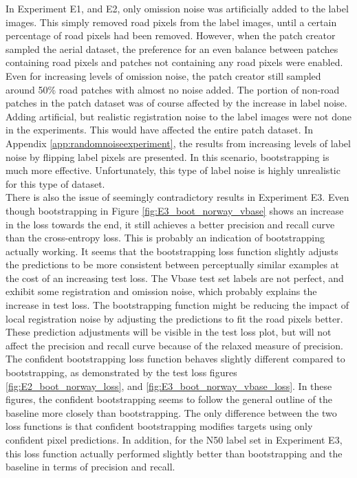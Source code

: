 In Experiment E1, and E2, only omission noise was artificially added to the label images. This simply removed road pixels from the label images, until a certain percentage of road pixels had been removed. However, when the patch creator sampled the aerial dataset, the preference for an even balance between patches containing road pixels and patches not containing any road pixels were enabled. Even for increasing levels of omission noise, the patch creator still sampled around 50\% road patches with almost no noise added. The portion of non-road patches in the patch dataset was of course affected by the increase in label noise. Adding artificial, but realistic registration noise to the label images were not done in the experiments. This would have affected the entire patch dataset. In Appendix \ref{app:randomnoiseexperiment}, the results from increasing levels of label noise by flipping label pixels are presented. In this scenario, bootstrapping is much more effective. Unfortunately, this type of label noise is highly unrealistic for this type of dataset.\\

There is also the issue of seemingly contradictory results in Experiment E3. Even though bootstrapping in Figure \ref{fig:E3_boot_norway_vbase} shows an increase in the loss towards the end, it still achieves a better precision and recall curve than the cross-entropy loss. This is probably an indication of bootstrapping actually working. It seems that the bootstrapping loss function slightly adjusts the predictions to be more consistent between perceptually similar examples at the cost of an increasing test loss. The Vbase test set labels are not perfect, and exhibit some registration and omission noise, which probably explains the increase in test loss. The bootstrapping function might be reducing the impact of local registration noise by adjusting the predictions to fit the road pixels better. These prediction adjustments will be visible in the test loss plot, but will not affect the precision and recall curve because of the relaxed measure of precision. \\

The confident bootstrapping loss function behaves slightly different compared to bootstrapping, as demonstrated by the test loss figures \ref{fig:E2_boot_norway_loss}, and \ref{fig:E3_boot_norway_vbase_loss}. In these figures, the confident bootstrapping seems to follow the general outline of the baseline more closely than bootstrapping. The only difference between the two loss functions is that confident bootstrapping modifies targets using only confident pixel predictions. In addition, for the N50 label set in Experiment E3, this loss function actually performed slightly better than bootstrapping and the baseline in terms of precision and recall. \\ 

